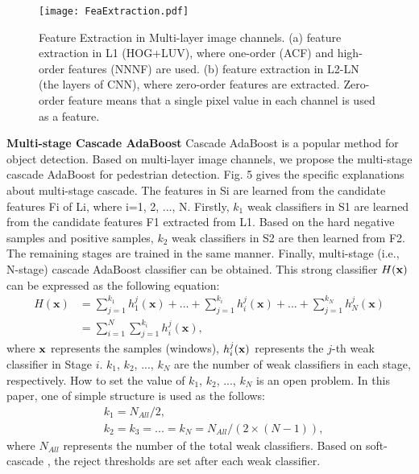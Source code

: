 \documentclass[journal]{IEEEtran}
\begin{document}
\begin{figure}[!t]
\label{FeaExtraction}
\centering
\texttt{[image: FeaExtraction.pdf]}
\caption{Feature Extraction in Multi-layer image channels. (a) feature extraction in L1 (HOG+LUV), where one-order (ACF) and high-order features (NNNF) are used. (b) feature extraction in L2-LN (the layers of CNN), where zero-order features are extracted. Zero-order feature means that a single pixel value in each channel is used as a feature. 
} 
\end{figure}

\textbf{Multi-stage Cascade AdaBoost} Cascade AdaBoost is a popular method for object detection. Based on multi-layer image channels, we propose the multi-stage cascade AdaBoost for pedestrian detection. Fig. 5 gives the specific explanations about multi-stage cascade. The features in Si are learned from the candidate features Fi  of Li, where i=1, 2, ..., N. Firstly, $k_1$ weak classifiers in S1 are learned from the candidate features F1 extracted from L1. Based on the hard negative samples and positive samples, $k_2$ weak classifiers in S2 are then learned from F2. The remaining stages are trained in the same manner. Finally, multi-stage (i.e., N-stage) cascade AdaBoost classifier can be obtained. This strong classifier $H(\bf{x})$ can be expressed as the following equation:
\begin{equation}
\begin{split}
H(\mathbf{x})&=\sum\limits_{j=1}^{k_1}{h_1^j(\mathbf{x})}+...+\sum\limits_{j=1}^{k_i}{h_i^j(\mathbf{x})}+...+\sum\limits_{j=1}^{k_N}{h_N^j(\mathbf{x})}
\\&=\sum\limits_{i=1}^{N}\sum\limits_{j=1}^{k_i}{h_i^j(\mathbf{x})},
\end{split}
\end{equation}
where $\bf{x}$ represents the samples (windows), $h_i^j(\bf{x})$ represents the $j$-th weak classifier in Stage $i$. $k_1$, $k_2$, ..., $k_N$ are the number of weak classifiers in each stage, respectively. How to set the value of $k_1$, $k_2$, ..., $k_N$  is an open problem. In this paper, one of simple structure is used  as the follows: 
\begin{equation}
\begin{split}
& k_1=N_{All}/2,
\\& k_2=k_3=...=k_N=N_{All}/(2\times(N-1)),
\end{split}
\end{equation}
where $N_{All}$ represents the number of the total weak classifiers. Based on soft-cascade \cite{Bourdev_SoftCascade_CVPR_2005}, the reject thresholds are set after each weak classifier.
\end{document}
